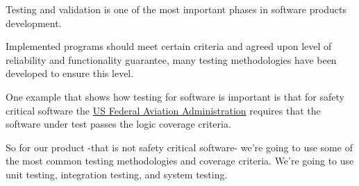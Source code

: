 Testing and validation is one of the most important phases in software products development.

Implemented programs should meet certain criteria and agreed upon level of reliability and functionality guarantee, many testing methodologies have been developed to ensure this level.

One example that shows how testing for software is important is that for safety critical software the \href{http://www.faa.gov/}{US Federal Aviation Administration} requires that the software under test passes the logic coverage criteria\cite{software_testing}.

So for our product -that is not safety critical software- we're going to use some of the most common testing methodologies and coverage criteria. We're going to use unit testing, integration testing, and system testing.